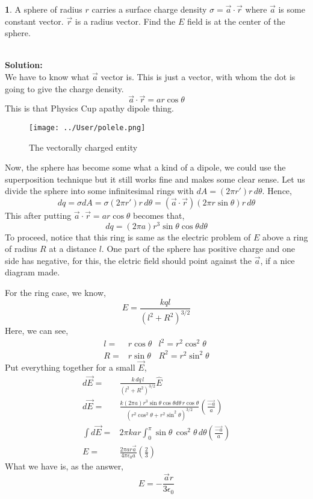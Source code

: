 \documentclass[a4paper]{article}
\theoremstyle{definition}
\newtheorem{prob}{ \framebox[0.09\textwidth]{{\sffamily Pr}} }
\newcommand{\pr}[1]{ \begin{tcolorbox} \begin{prob} 
    #1 
\end{prob} 
   \end{tcolorbox}\ 
   \\
 }
\begin{document}
\pr{A sphere of radius $r$ carries a surface charge density
$\sigma = \vec{a} \cdot \vec{r}$ where $\vec{a}$ is some constant vector. $\vec{r}$ is a radius
vector. Find the $E$ field is at the center of the sphere.}
\textbf{Solution:} \\
We have to know what $\vec{a}$ vector is. This is  just a vector, with whom the dot is going to give the charge density. 
\[ \vec{a} \cdot \vec{r} = ar \cos \theta \]
This is that Physics Cup apathy dipole thing. 
\begin{figure}[hbtp]
\centering
\texttt{[image: ../User/polele.png]}
\caption{The vectorally charged entity}
\end{figure}
Now, the sphere has become some what a kind of a dipole, we could use the superposition technique but it still works fine and makes some clear sense. Let us divide the sphere into some infinitesimal rings with $dA = (2 \pi r') r \, d\theta$. Hence, 
\[ dq = \sigma dA = \sigma (2 \pi r') r \, d\theta = (\vec{a} \cdot \vec{r}) (2 \pi r \sin \theta) r \, d\theta \]
This after putting $ \vec{a} \cdot \vec{r} = ar \cos \theta $ becomes that, 
\[ dq =( 2 \pi a )r^3 \sin \theta \cos \theta d\theta \]
To proceed, notice that this ring is same as the electric problem of $E$ above a ring of radius $R$ at a distance $l$. One part of the sphere has positive charge and one side has negative, for this, the elctric field should point against the $\vec{a}$, if a nice diagram made. 

For the ring case, we know, 
\begin{equation}
E = \frac{k q l}{(l^2 + R^2)^{3/2}}
\end{equation}
Here, we can see, 
\begin{align*}
l =& r \cos \theta  &l^2 = r^2 \cos ^2 \theta \\
R =& r \sin \theta  &R^2 = r^2 \sin ^2 \theta 
\end{align*}
Put everything together for a small $\vec{E}$, 
\begin{align*}
d\vec{E} =& \frac{k \, dq \, l}{(l^2 + R^2)^{3/2}} \hat{E}\\
d \vec{E} =& \frac{k ( 2 \pi a )r^3 \sin \theta \cos \theta d\theta \, r \cos \theta }
{( r^2 \cos ^2 \theta +  r^2 \sin ^2 \theta )^{3/2}} \left( \frac{\vec{-a}}{a} \right)\\
\int d\vec{E} =& 
2 \pi k a r 
\int_{0}^{\pi} \sin \theta \, \cos ^2 \theta \, d\theta \left( \frac{\vec{-a}}{a} \right) \\
E =& \frac{ 2 \pi a r \vec{a}}{4 \pi \epsilon_0 a} \left(\frac{2}{3}\right) 
\end{align*}
What we have is, as the answer, 
\[ E = -\frac{\vec{a} r}{3 \epsilon_0}\]
\end{document}

